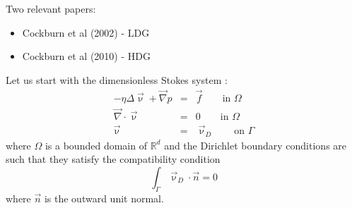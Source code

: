 Two relevant papers: 
\begin{itemize}
\item Cockburn et al (2002) \cite{coks02} - LDG
\item Cockburn et al (2010) \cite{conp10} - HDG
\end{itemize}

Let us start with the dimensionless Stokes system \cite{coks02}:
\begin{eqnarray}
- \eta \Delta \vec\upnu + \vec\nabla p &=& \vec{f}  \qquad \textrm{in } \Omega\\
\vec\nabla\cdot\vec\upnu &=& 0 \qquad \textrm{in } \Omega\\
\vec{\upnu} &=& \vec{\upnu}_D \qquad \textrm{on } \Gamma
\end{eqnarray}
where $\Omega$ is a bounded domain of $\mathbb{R}^d$ and the Dirichlet boundary conditions are
such that they satisfy the compatibility condition
\[
\int_\Gamma \vec\upnu_D \cdot \vec{n} =0
\]
where $\vec{n}$ is the outward unit normal. 


